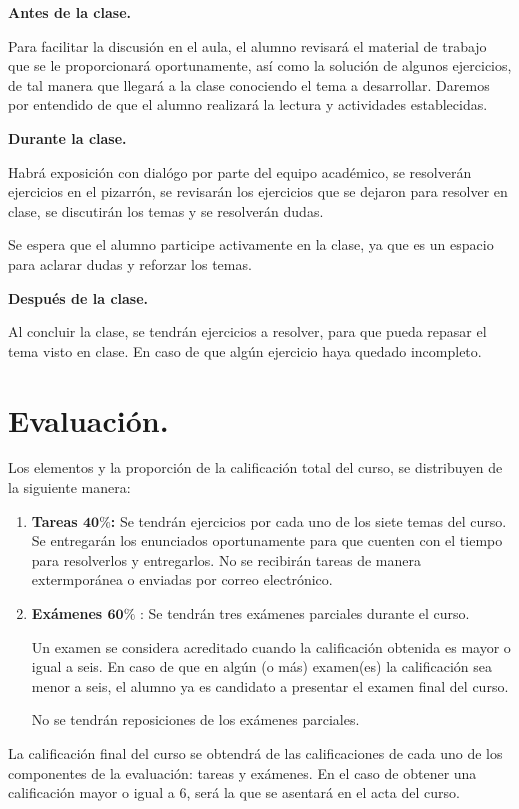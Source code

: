 \documentclass[hidelinks,12pt]{article}
\begin{document}
\noindent
\textbf{Antes de la clase.}
\par
Para facilitar la discusión en el aula, el alumno revisará el material de trabajo que se le proporcionará oportunamente, así como la solución de algunos ejercicios, de tal manera que llegará a la clase conociendo el tema a desarrollar. Daremos por entendido de que el alumno realizará la lectura y actividades establecidas.
\par
\textbf{Durante la clase.}
\par
Habrá exposición con dialógo por parte del equipo académico, se resolverán ejercicios en el pizarrón, se revisarán los ejercicios que se dejaron para resolver en clase, se discutirán los temas y se resolverán dudas.
\par
Se espera que el alumno participe activamente en la clase, ya que es un espacio para aclarar dudas y reforzar los temas.
\par
\textbf{Después de la clase.}
\par
Al concluir la clase, se tendrán ejercicios a resolver, para que pueda repasar el tema visto en clase. En caso de que algún ejercicio haya quedado incompleto.

\section{Evaluación.}

Los elementos y la proporción de la calificación total del curso, se distribuyen de la siguiente manera:
\begin{enumerate}[label=\alph*)]
\item \textbf{Tareas $\mathbf{40\%}$:} Se tendrán ejercicios por cada uno de los siete temas del curso. Se entregarán los enunciados oportunamente para que cuenten con el tiempo para resolverlos y entregarlos. No se recibirán tareas de manera extermporánea o enviadas por correo electrónico.
\item \textbf{Exámenes $\mathbf{60\%}$} : Se tendrán tres exámenes parciales durante el curso.
\par
Un examen se considera acreditado cuando la calificación obtenida es mayor o igual a seis. En caso de que en algún (o más) examen(es) la calificación sea menor a seis, el alumno ya es candidato a presentar el examen final del curso.
\par
No se tendrán reposiciones de los exámenes parciales.
\end{enumerate}
La calificación final del curso se obtendrá de las calificaciones de cada uno de los componentes de la evaluación: tareas y exámenes. En el caso de obtener una calificación mayor o igual a $6$, será la que se asentará en el acta del curso.
\end{document}
